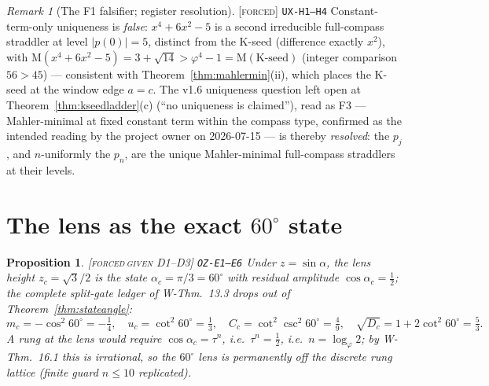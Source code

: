 \documentclass[11pt]{article}
\newcommand{\tagF}{\textcolor{cF}{\textsc{[forced]}}}
\newcommand{\tagFD}{\textcolor{cF}{\textsc{[forced}}\,\textcolor{cD}{\textsc{given D1--D3]}}}
\newcommand{\hx}[1]{\textcolor{cC}{\footnotesize\texttt{#1}}}
\newcommand{\gp}{\varphi}
\newcommand{\M}{\mathrm{M}}
\theoremstyle{plain}
\newtheorem{proposition}[theorem]{Proposition}
\theoremstyle{definition}
\theoremstyle{remark}
\newtheorem{remark}[theorem]{Remark}
\begin{document}
\begin{remark}[The F1 falsifier; register resolution]\label{rem:f1falsifier}\tagF{} \hx{UX-H1--H4}
Constant-term-only uniqueness is \emph{false}: $x^4+6x^2-5$ is a second
irreducible full-compass straddler at level $|p(0)|=5$, distinct from the
K-seed (difference exactly $x^2$), with
$\M(x^4+6x^2-5)=3+\sqrt{14}>\gp^4-1=\M(\text{K-seed})$ (integer comparison
$56>45$) --- consistent with Theorem~\ref{thm:mahlermin}(ii), which places
the K-seed at the window edge $a=c$. The v1.6 uniqueness question left open
at Theorem~\ref{thm:kseedladder}(c) (``no uniqueness is claimed''), read as
F3 --- Mahler-minimal at fixed constant term within the compass type,
confirmed as the intended reading by the project owner on 2026-07-15 --- is
thereby \emph{resolved}: the $p_j$, and $n$-uniformly the $p_n$, are the
unique Mahler-minimal full-compass straddlers at their levels.
\end{remark}

\section{The lens as the exact $60^\circ$ state}\label{sec:lens}

\begin{proposition}\label{prop:lens}\tagFD{} \hx{OZ-E1--E6}
Under $z=\sin\alpha$, the lens height $z_c=\sqrt3/2$ is the state
$\alpha_c=\pi/3=60^\circ$ with residual amplitude $\cos\alpha_c=\tfrac12$; the
complete split-gate ledger of W-Thm.\ 13.3 drops out of
Theorem~\ref{thm:stateangle}:
\[
m_c=-\cos^2 60^\circ=-\tfrac14,\quad
u_c=\cot^2 60^\circ=\tfrac13,\quad
C_c=\cot^2\!\csc^2 60^\circ=\tfrac49,\quad
\sqrt{D_c}=1+2\cot^2 60^\circ=\tfrac53 .
\]
A rung at the lens would require $\cos\alpha_c=\tau^n$, i.e.\ $\tau^n=\tfrac12$,
i.e.\ $n=\log_\gp2$; by W-Thm.\ 16.1 this is irrational, so the $60^\circ$ lens is
permanently off the discrete rung lattice (finite guard $n\le10$ replicated).
\end{proposition}
\end{document}
